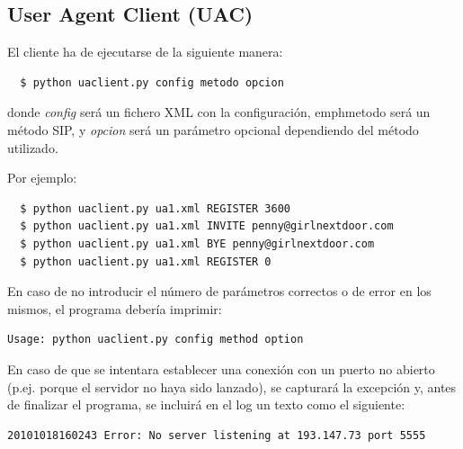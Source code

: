 \documentclass[a4paper,11pt]{article}
\begin{document}

\subsection{User Agent Client (UAC)}

El cliente ha de ejecutarse de la siguiente manera:
\begin{verbatim}
  $ python uaclient.py config metodo opcion
\end{verbatim}

donde \emph{config} será un fichero XML con la configuración,
emph{metodo} será un método SIP, y \emph{opcion} será un parámetro
opcional dependiendo del método utilizado.

Por ejemplo:
\begin{verbatim}
  $ python uaclient.py ua1.xml REGISTER 3600
  $ python uaclient.py ua1.xml INVITE penny@girlnextdoor.com
  $ python uaclient.py ua1.xml BYE penny@girlnextdoor.com
  $ python uaclient.py ua1.xml REGISTER 0
\end{verbatim}

En caso de no introducir el número de parámetros correctos o de error en los mismos, el programa debería imprimir:
\begin{verbatim}
Usage: python uaclient.py config method option
\end{verbatim}

En caso de que se intentara establecer una conexión con un puerto no abierto
(p.ej. porque el servidor no haya sido lanzado), se capturará la excepción y, antes de finalizar el programa, se incluirá en el log un texto como el siguiente:
\begin{verbatim}
20101018160243 Error: No server listening at 193.147.73 port 5555
\end{verbatim}
\end{document}

